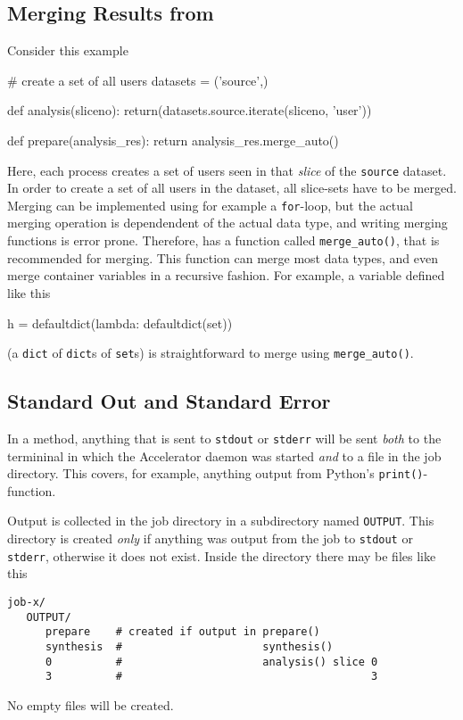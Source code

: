 \subsection{Merging Results from \analysis}
Consider this example
\begin{python}
# create a set of all users
datasets = ('source',)
  
def analysis(sliceno):
    return(datasets.source.iterate(sliceno, 'user'))

def prepare(analysis_res):
    return analysis_res.merge_auto()
\end{python}
Here, each \analysis process creates a set of users seen in that
\textsl{slice} of the \texttt{source} dataset.  In order to create a
set of all users in the dataset, all slice-sets have to be merged.
Merging can be implemented using for example a \texttt{for}-loop, but
the actual merging operation is dependendent of the actual data type,
and writing merging functions is error prone.  Therefore, \analysisres
has a function called \texttt{merge\_auto()}, that is recommended for
merging.  This function can merge most data types, and even merge
container variables in a recursive fashion.  For example, a variable
defined like this 
\begin{python}
h = defaultdict(lambda: defaultdict(set))
\end{python}
(a \texttt{dict} of \texttt{dict}s of \texttt{set}s) is
straightforward to merge using \texttt{merge\_auto()}.


\subsection{Standard Out and Standard Error}
\label{sec:OUTPUT}
In a method, anything that is sent to \texttt{stdout} or
\texttt{stderr} will be sent \textsl{both} to the termininal in which
the Accelerator daemon was started \textsl{and} to a file in the job
directory.  This covers, for example, anything output from Python's
\texttt{print()}-function.

Output is collected in the job directory in a subdirectory named
\texttt{OUTPUT}.  This directory is created \textsl{only} if anything
was output from the job to \texttt{stdout} or \texttt{stderr},
otherwise it does not exist.  Inside the directory there may be files
like this
\begin{verbatim}
job-x/
   OUTPUT/
      prepare    # created if output in prepare()
      synthesis  #                      synthesis()
      0          #                      analysis() slice 0
      3          #                                       3
\end{verbatim}
No empty files will be created.



